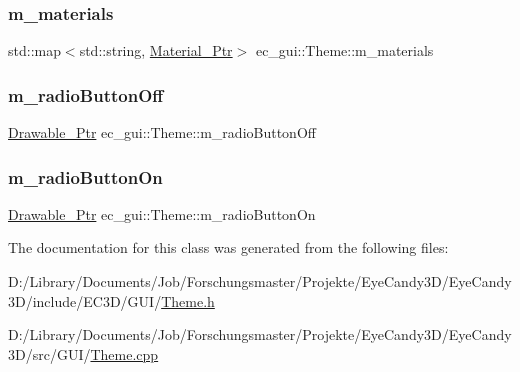 \mbox{\label{classec__gui_1_1_theme_a487d27c57cc712153f02a8cf30667e9c}} 
\subsubsection{\texorpdfstring{m\+\_\+materials}{m\_materials}}
{\footnotesize\ttfamily std\+::map$<$std\+::string, \mbox{\hyperlink{classec__gui_1_1_theme_a11b77ff5a6cc1076926894595d564b96}{Material\+\_\+\+Ptr}}$>$ ec\+\_\+gui\+::\+Theme\+::m\+\_\+materials\hspace{0.3cm}{\ttfamily [protected]}}

\mbox{\label{classec__gui_1_1_theme_a82a501e3c636a5873012840251ef4493}} 
\subsubsection{\texorpdfstring{m\+\_\+radio\+Button\+Off}{m\_radioButtonOff}}
{\footnotesize\ttfamily \mbox{\hyperlink{classec__gui_1_1_theme_aa831418117dca2cf1b0c390bd0da97c1}{Drawable\+\_\+\+Ptr}} ec\+\_\+gui\+::\+Theme\+::m\+\_\+radio\+Button\+Off}

\mbox{\label{classec__gui_1_1_theme_a32ec365be4eb0c808efcf0d08ae9c07d}} 
\subsubsection{\texorpdfstring{m\+\_\+radio\+Button\+On}{m\_radioButtonOn}}
{\footnotesize\ttfamily \mbox{\hyperlink{classec__gui_1_1_theme_aa831418117dca2cf1b0c390bd0da97c1}{Drawable\+\_\+\+Ptr}} ec\+\_\+gui\+::\+Theme\+::m\+\_\+radio\+Button\+On}



The documentation for this class was generated from the following files\+:\begin{DoxyCompactItemize}
\item 
D\+:/\+Library/\+Documents/\+Job/\+Forschungsmaster/\+Projekte/\+Eye\+Candy3\+D/\+Eye\+Candy3\+D/include/\+E\+C3\+D/\+G\+U\+I/\mbox{\hyperlink{_theme_8h}{Theme.\+h}}\item 
D\+:/\+Library/\+Documents/\+Job/\+Forschungsmaster/\+Projekte/\+Eye\+Candy3\+D/\+Eye\+Candy3\+D/src/\+G\+U\+I/\mbox{\hyperlink{_theme_8cpp}{Theme.\+cpp}}\end{DoxyCompactItemize}
